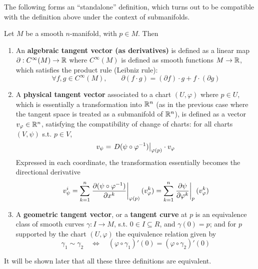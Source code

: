 \documentclass{article}
\begin{document}
The following forms an ``standalone'' definition, which turns out to be compatible with the definition above under the context of submanifolds.

\begin{definition}
    Let $M$ be a smooth $n$-manifold, with $p \in M$. Then
    \begin{enumerate}[label=\roman*)]
        \item An \textbf{algebraic tangent vector (as derivatives)} is defined as a linear map $\partial: C^{\infty}(M) \to \mathbb{R}$ where $C^{\infty}(M)$ is defined as smooth functions $M \to \mathbb{R}$, which satisfies the product rule (Leibniz rule):
        \[
            \forall f, g \in C^{\infty}(M), \qquad \partial(f \cdot g) = (\partial f) \cdot g + f \cdot (\partial g)
        \]
        \item A \textbf{physical tangent vector} associated to a chart $(U, \varphi)$ where $p \in U$, which is essentially a transformation into $\mathbb{R}^n$ (as in the previous case where the tangent space is treated as a submanifold of $\mathbb{R}^n$), is defined as a vector $v_{\varphi} \in \mathbb{R}^n$, satisfying the compatibility of change of charts: for all charts $(V, \psi)$ s.t. $p \in V$,
        \[
            v_{\psi} = \left.D(\psi \circ \varphi^{-1})\right|_{\varphi(p)} \cdot v_{\varphi}
        \]
        Expressed in each coordinate, the transformation essentially becomes the directional derivative
        \[
            v_{\psi}^i = \sum_{k = 1}^n \left.\frac{\partial (\psi \circ \varphi^{-1})}{\partial x^k}\right|_{\varphi(p)} (v_{\varphi}^k) = \sum_{k=1}^n \left.\frac{\partial \psi}{\partial \varphi^k}\right|_{p} (v_{\varphi}^k)
        \]
        \item A \textbf{geometric tangent vector}, or a \textbf{tangent curve} at $p$ is an equivalence class of smooth curves $\gamma: I \to M$, s.t. $0 \in I \subseteq R$, and $\gamma(0) = p$; and for $p$ supported by the chart $(U, \varphi)$ the equivalence relation given by
        \[
            \gamma_1 \sim \gamma_2 \quad \iff \quad (\varphi \circ \gamma_1)'(0) = (\varphi \circ \gamma_2)'(0)
        \]
    \end{enumerate}
    It will be shown later that all these three definitions are equivalent.
\end{definition}
\end{document}
